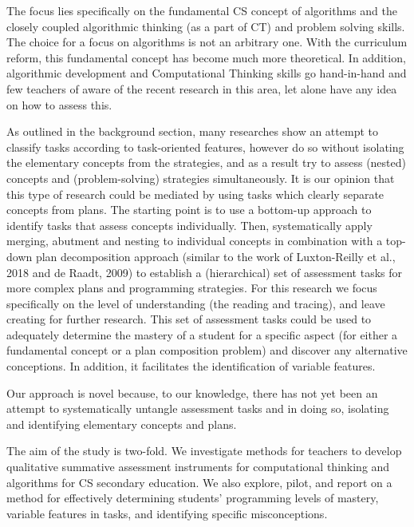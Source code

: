 The focus lies specifically on the fundamental CS concept of algorithms and the closely coupled algorithmic thinking (as a part of CT) and problem solving skills. The choice for a focus on algorithms is not an arbitrary one. With the curriculum reform, this fundamental concept has become much more theoretical. In addition, algorithmic development and Computational Thinking skills go hand-in-hand and few teachers of aware of the recent research in this area, let alone have any idea on how to assess this.







As outlined in the background section, many researches show an attempt to classify tasks according to task-oriented features, however do so without isolating the elementary concepts from the strategies, and as a result try to assess (nested) concepts and (problem-solving) strategies simultaneously. It is our opinion that this type of research could be mediated by using tasks which clearly separate concepts from plans. The starting point is to use a bottom-up approach to identify tasks that assess concepts individually. Then, systematically apply merging, abutment and nesting to individual concepts in combination with a top-down plan decomposition approach (similar to the work of Luxton-Reilly et al., 2018 and de Raadt, 2009) to establish a (hierarchical) set of assessment tasks for more complex plans and programming strategies. For this research we focus specifically on the level of understanding (the reading and tracing), and leave creating for further research. This set of assessment tasks could be used to adequately determine the mastery of a student for a specific aspect (for either a fundamental concept or a plan composition problem) and discover any alternative conceptions. In addition, it facilitates the identification of variable features.

Our approach is novel because, to our knowledge, there has not yet been an attempt to systematically untangle assessment tasks and in doing so, isolating and identifying elementary concepts and plans.



The aim of the study is two-fold. We investigate methods for teachers to develop qualitative summative assessment instruments for computational thinking and algorithms for CS secondary education. We also explore, pilot, and report on a method for effectively determining students' programming levels of mastery, variable features in tasks, and identifying specific misconceptions.

